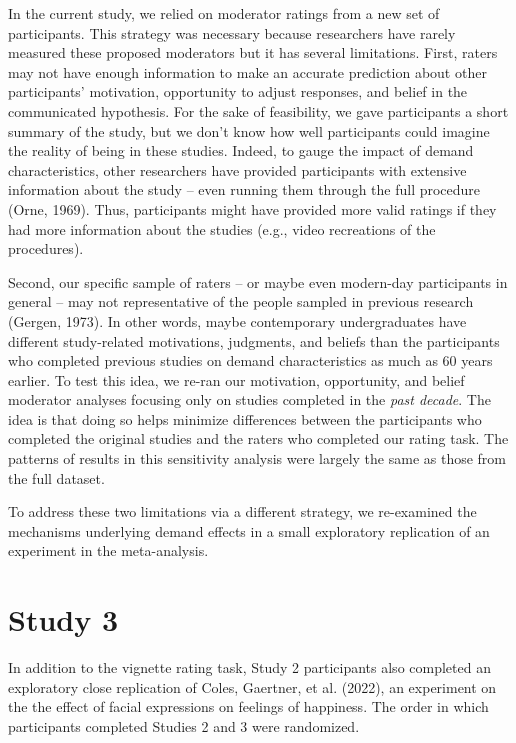 \documentclass[
  man,floatsintext]{apa6}
\begin{document}
In the current study, we relied on moderator ratings from a new set of participants. This strategy was necessary because researchers have rarely measured these proposed moderators but it has several limitations. First, raters may not have enough information to make an accurate prediction about other participants' motivation, opportunity to adjust responses, and belief in the communicated hypothesis. For the sake of feasibility, we gave participants a short summary of the study, but we don't know how well participants could imagine the reality of being in these studies. Indeed, to gauge the impact of demand characteristics, other researchers have provided participants with extensive information about the study -- even running them through the full procedure (Orne, 1969). Thus, participants might have provided more valid ratings if they had more information about the studies (e.g., video recreations of the procedures).

Second, our specific sample of raters -- or maybe even modern-day participants in general -- may not representative of the people sampled in previous research (Gergen, 1973). In other words, maybe contemporary undergraduates have different study-related motivations, judgments, and beliefs than the participants who completed previous studies on demand characteristics as much as 60 years earlier. To test this idea, we re-ran our motivation, opportunity, and belief moderator analyses focusing only on studies completed in the \emph{past decade}. The idea is that doing so helps minimize differences between the participants who completed the original studies and the raters who completed our rating task. The patterns of results in this sensitivity analysis were largely the same as those from the full dataset.

To address these two limitations via a different strategy, we re-examined the mechanisms underlying demand effects in a small exploratory replication of an experiment in the meta-analysis.

\hypertarget{study-3}{%
\section{Study 3}\label{study-3}}

In addition to the vignette rating task, Study 2 participants also completed an exploratory close replication of Coles, Gaertner, et al. (2022), an experiment on the the effect of facial expressions on feelings of happiness. The order in which participants completed Studies 2 and 3 were randomized.
\end{document}
